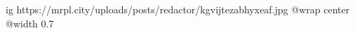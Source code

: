  
 
 
 
 

\ifcmt
  ig https://mrpl.city/uploads/posts/redactor/kgvijtezabhyxeaf.jpg
  @wrap center
  @width 0.7
\fi
